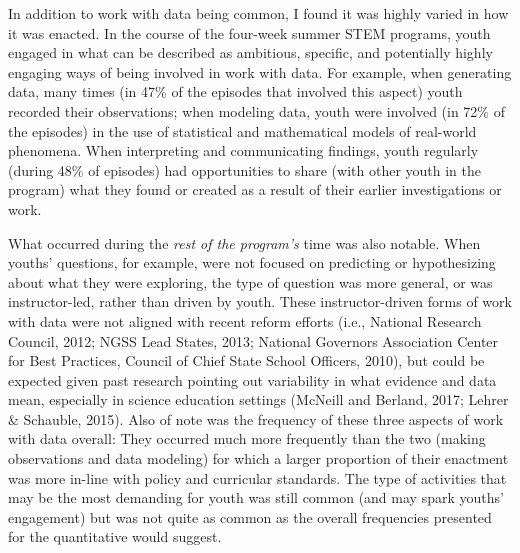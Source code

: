 \documentclass[]{msu-thesis}
\theoremstyle{definition}
\theoremstyle{definition}
\theoremstyle{definition}
\theoremstyle{remark}
\begin{document}
In addition to work with data being common, I found it was highly varied
in how it was enacted. In the course of the four-week summer STEM
programs, youth engaged in what can be described as ambitious, specific,
and potentially highly engaging ways of being involved in work with
data. For example, when generating data, many times (in 47\% of the
episodes that involved this aspect) youth recorded their observations;
when modeling data, youth were involved (in 72\% of the episodes) in the
use of statistical and mathematical models of real-world phenomena. When
interpreting and communicating findings, youth regularly (during 48\% of
episodes) had opportunities to share (with other youth in the program)
what they found or created as a result of their earlier investigations
or work.

What occurred during the \emph{rest of the program's} time was also
notable. When youths' questions, for example, were not focused on
predicting or hypothesizing about what they were exploring, the type of
question was more general, or was instructor-led, rather than driven by
youth. These instructor-driven forms of work with data were not aligned
with recent reform efforts (i.e., National Research Council, 2012; NGSS
Lead States, 2013; National Governors Association Center for Best
Practices, Council of Chief State School Officers, 2010), but could be
expected given past research pointing out variability in what evidence
and data mean, especially in science education settings (McNeill and
Berland, 2017; Lehrer \& Schauble, 2015). Also of note was the frequency
of these three aspects of work with data overall: They occurred much
more frequently than the two (making observations and data modeling) for
which a larger proportion of their enactment was more in-line with
policy and curricular standards. The type of activities that may be the
most demanding for youth was still common (and may spark youths'
engagement) but was not quite as common as the overall frequencies
presented for the quantitative would suggest.
\end{document}

